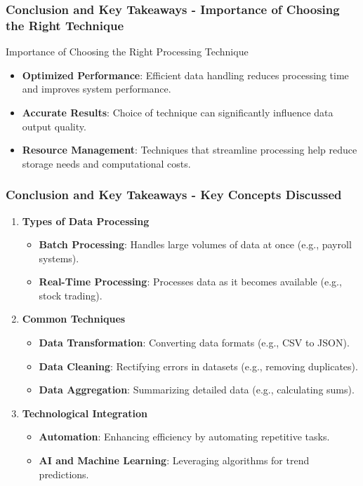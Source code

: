 \documentclass[aspectratio=169]{beamer}
\begin{document}
\begin{frame}[fragile]
  \frametitle{Conclusion and Key Takeaways - Importance of Choosing the Right Technique}
  \begin{block}{Importance of Choosing the Right Processing Technique}
    \begin{itemize}
      \item \textbf{Optimized Performance}: Efficient data handling reduces processing time and improves system performance.
      \item \textbf{Accurate Results}: Choice of technique can significantly influence data output quality.
      \item \textbf{Resource Management}: Techniques that streamline processing help reduce storage needs and computational costs.
    \end{itemize}
  \end{block}
\end{frame}

\begin{frame}[fragile]
  \frametitle{Conclusion and Key Takeaways - Key Concepts Discussed}
  \begin{enumerate}
    \item \textbf{Types of Data Processing}
      \begin{itemize}
        \item \textbf{Batch Processing}: Handles large volumes of data at once (e.g., payroll systems).
        \item \textbf{Real-Time Processing}: Processes data as it becomes available (e.g., stock trading).
      \end{itemize}
    
    \item \textbf{Common Techniques}
      \begin{itemize}
        \item \textbf{Data Transformation}: Converting data formats (e.g., CSV to JSON).
        \item \textbf{Data Cleaning}: Rectifying errors in datasets (e.g., removing duplicates).
        \item \textbf{Data Aggregation}: Summarizing detailed data (e.g., calculating sums).
      \end{itemize}

    \item \textbf{Technological Integration}
      \begin{itemize}
        \item \textbf{Automation}: Enhancing efficiency by automating repetitive tasks.
        \item \textbf{AI and Machine Learning}: Leveraging algorithms for trend predictions.
      \end{itemize}
  \end{enumerate}
\end{frame}
\end{document}
